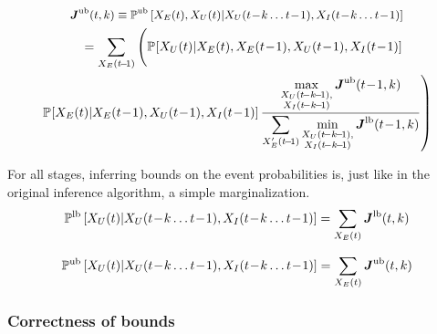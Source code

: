\documentclass[10pt]{article}
\newcommand{\X}{\mathcal{X}}
\newcommand{\PP}[2][]{\mathbb{P\!}_{#1}\left[#2\right]}
\newcommand{\PPlb}[2][]{\mathbb{P}^\text{lb}_{#1}\left[#2\right]}
\newcommand{\PPub}[2][]{\mathbb{P}^\text{ub}_{#1}\left[#2\right]}
\begin{document}
\begin{multline}
\small
\boldsymbol{J}^\text{ub}(t,k)\equiv \PPub{X_{E}(t),X_{U}(t)|X_{U}(t\!-\!k\ldots t\!-\!1),X_{I}(t\!-\!k\ldots t\!-\!1)}\\
\shoveleft
{
\quad\quad\,\,\,
=\sum_{X_{E}(t\!-\!1)}
\Bigg(
\PP{X_{U}(t)|X_{E}(t),X_{E}(t\!-\!1),X_{U}(t\!-\!1),X_{I}(t\!-\!1)}
}
\\
\left.
\PP{X_{E}(t)|X_{E}(t\!-\!1),X_{U}(t\!-\!1),X_{I}(t\!-\!1)}
\frac{
\displaystyle\max_{\substack{X_{U}(t\!-k\!-\!1),\\X_{I}(t\!-k\!-\!1)}} \boldsymbol{J}^\text{ub}(t\!-\!1,k)
}{
  \displaystyle\sum_{X_{E}'(t\!-\!1)} 
  \displaystyle\min_{\substack{X_{U}(t\!-k\!-\!1),\\X_{I}(t\!-k\!-\!1)}} \boldsymbol{J}^\text{lb}(t\!-\!1,k) 
}
\right)%
\label{eq:joint-max}
\end{multline}

\noindent For all stages, inferring bounds on the event probabilities is, just like in the original inference algorithm, a simple marginalization.
\begin{multline}
\PPlb{X_{U}(t)|X_{U}(t\!-\!k\ldots t\!-\!1),X_{I}(t\!-\!k\ldots t\!-\!1)} = 
\sum_{X_{E}(t)} 
\boldsymbol{J}^\text{lb}(t,k)
\label{eq:cpt-after-marginalization-min}
\hfill
\end{multline}

\begin{multline}
\PPub{X_{U}(t)|X_{U}(t\!-\!k\ldots t\!-\!1),X_{I}(t\!-\!k\ldots t\!-\!1)} = 
\sum_{X_{E}(t)} 
\boldsymbol{J}^\text{ub}(t,k)
\label{eq:cpt-after-marginalization-max}
\hfill
\end{multline}


\subsubsection{Correctness of bounds}
\end{document}
